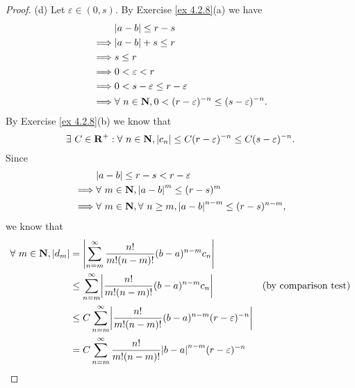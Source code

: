 \begin{proof}{(d)}
    Let \(\varepsilon \in (0, s)\).
    By Exercise \ref{ex 4.2.8}(a) we have
    \begin{align*}
                 & \abs*{a - b} \leq r - s                                                            \\
        \implies & \abs*{a - b} + s \leq r                                                            \\
        \implies & s \leq r                                                                           \\
        \implies & 0 < \varepsilon < r                                                                \\
        \implies & 0 < s - \varepsilon \leq r - \varepsilon                                           \\
        \implies & \forall\ n \in \mathbf{N}, 0 < (r - \varepsilon)^{-n} \leq (s - \varepsilon)^{-n}.
    \end{align*}
    By Exercise \ref{ex 4.2.8}(b) we know that
    \[
        \exists\ C \in \mathbf{R}^+ : \forall\ n \in \mathbf{N}, \abs*{c_n} \leq C (r - \varepsilon)^{-n} \leq C (s - \varepsilon)^{-n}.
    \]
    Since
    \begin{align*}
                 & \abs*{a - b} \leq r - s < r - \varepsilon                                                \\
        \implies & \forall\ m \in \mathbf{N}, \abs*{a - b}^{m} \leq (r - s)^m                               \\
        \implies & \forall\ m \in \mathbf{N}, \forall\ n \geq m, \abs*{a - b}^{n - m} \leq (r - s)^{n - m},
    \end{align*}
    we know that
    \begin{align*}
        \forall\ m \in \mathbf{N}, \abs*{d_m} & = \abs*{\sum_{n = m}^\infty \frac{n!}{m! (n - m)!} (b - a)^{n - m} c_n}                                                            \\
                                              & \leq \sum_{n = m}^\infty \abs*{\frac{n!}{m! (n - m)!} (b - a)^{n - m} c_n}                      & \text{(by comparison test)}      \\
                                              & \leq C \sum_{n = m}^\infty \abs*{\frac{n!}{m! (n - m)!} (b - a)^{n - m} (r - \varepsilon)^{-n}}                                    \\
                                              & = C \sum_{n = m}^\infty \frac{n!}{m! (n - m)!} \abs*{b - a}^{n - m} (r - \varepsilon)^{-n}                                         \\

\end{align*}
\end{proof}
